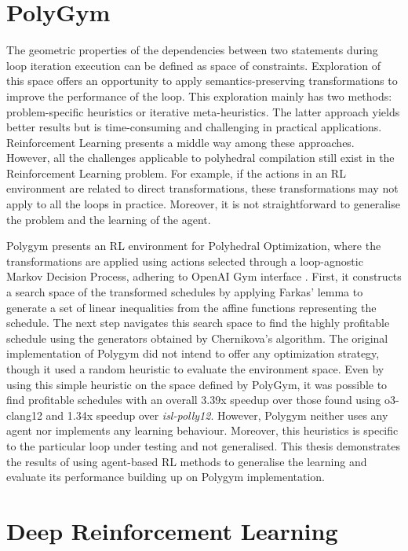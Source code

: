\documentclass[logo,msc]{infthesis}           %
\begin{document}
\section{PolyGym}

The geometric properties of the dependencies between two statements during loop iteration execution can be defined as space of constraints. Exploration of this space offers an opportunity to apply semantics-preserving transformations to improve the performance of the loop. This exploration mainly has two methods: problem-specific heuristics \cite{isl} \cite{Bondhugula07pluto:a} or iterative meta-heuristics\cite{it_Single}\cite{it_multi}. The latter approach yields better results but is time-consuming and challenging in practical applications. Reinforcement Learning presents a middle way among these approaches. However, all the challenges applicable to polyhedral compilation still exist in the Reinforcement Learning problem. For example, if the actions in an RL environment are related to direct transformations, these transformations may not apply to all the loops in practice. Moreover, it is not straightforward to generalise the problem and the learning of the agent.

Polygym presents an RL environment for Polyhedral Optimization\cite{PolyOpt}, where the transformations are applied using actions selected through a loop-agnostic Markov Decision Process, adhering to OpenAI Gym interface \cite{Gym}. First, it constructs a search space of the transformed schedules by applying Farkas' lemma \cite{schrijver1998theory} to generate a set of linear inequalities from the affine functions representing the schedule. The next step navigates this search space to find the highly profitable schedule using the generators obtained by Chernikova's algorithm. The original implementation of Polygym did not intend to offer any optimization strategy, though it used a random heuristic to evaluate the environment space. Even by using this simple heuristic on the space defined by PolyGym, it was possible to find profitable schedules with an overall 3.39x speedup over those found using o3-clang12 and 1.34x speedup over \textit{isl-polly12}. However, Polygym neither uses any agent nor implements any learning behaviour. Moreover, this heuristics is specific to the particular loop under testing and not generalised. This thesis demonstrates the results of using agent-based RL methods to generalise the learning and evaluate its performance building up on Polygym implementation.

\section{Deep Reinforcement Learning}
\end{document}
